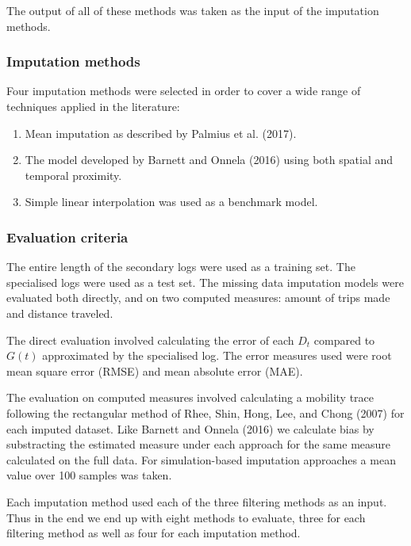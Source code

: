 \documentclass[english,man]{apa6}
\providecommand{\tightlist}{%
  \setlength{\itemsep}{0pt}\setlength{\parskip}{0pt}}
\theoremstyle{definition}
\theoremstyle{definition}
\theoremstyle{definition}
\theoremstyle{remark}
\begin{document}
The output of all of these methods was taken as the input of the
imputation methods.

\subsubsection{Imputation methods}\label{imputation-methods}

Four imputation methods were selected in order to cover a wide range of
techniques applied in the literature:

\begin{enumerate}
\def\labelenumi{\arabic{enumi}.}
\tightlist
\item
  Mean imputation as described by Palmius et al. (2017).
\item
  The model developed by Barnett and Onnela (2016) using both spatial
  and temporal proximity.
\item
  Simple linear interpolation was used as a benchmark model.
\end{enumerate}

\subsubsection{Evaluation criteria}\label{evaluation-criteria}

The entire length of the secondary logs were used as a training set. The
specialised logs were used as a test set. The missing data imputation
models were evaluated both directly, and on two computed measures:
amount of trips made and distance traveled.

The direct evaluation involved calculating the error of each \(D_t\)
compared to \(G(t)\) approximated by the specialised log. The error
measures used were root mean square error (RMSE) and mean absolute error
(MAE).

The evaluation on computed measures involved calculating a mobility
trace following the rectangular method of Rhee, Shin, Hong, Lee, and
Chong (2007) for each imputed dataset. Like Barnett and Onnela (2016) we
calculate bias by substracting the estimated measure under each approach
for the same measure calculated on the full data. For simulation-based
imputation approaches a mean value over 100 samples was taken.

Each imputation method used each of the three filtering methods as an
input. Thus in the end we end up with eight methods to evaluate, three
for each filtering method as well as four for each imputation method.
\end{document}
